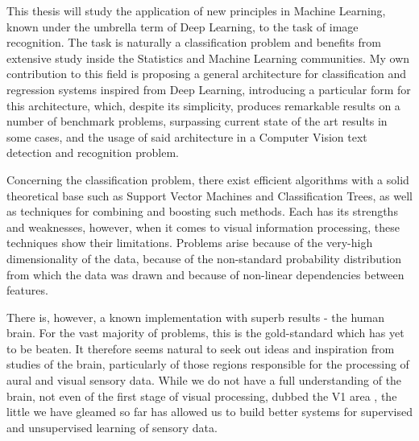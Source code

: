 \documentclass[12pt,a4paper,oneside,english]{UPBThesis}
\begin{document}

This thesis will study the application of new principles in Machine Learning, known under the umbrella term of Deep Learning, to the task of image recognition. The task is naturally a classification problem and benefits from extensive study inside the Statistics and Machine Learning communities. My own contribution to this field is proposing a general architecture for classification and regression systems inspired from Deep Learning, introducing a particular form for this architecture, which, despite its simplicity, produces remarkable results on a number of benchmark problems, surpassing current state of the art results in some cases, and the usage of said architecture in a Computer Vision text detection and recognition problem.

Concerning the classification problem, there exist efficient algorithms with a solid theoretical base such as Support Vector Machines and Classification Trees, as well as techniques for combining and boosting such methods. Each has its strengths and weaknesses, however,  when it comes to visual information processing, these techniques show their limitations. Problems arise because of the very-high dimensionality of the data, because of the non-standard probability distribution from which the data was drawn and because of non-linear dependencies between features.

There is, however, a known implementation with superb results - the human brain. For the vast majority of problems, this is the gold-standard which has yet to be beaten. It therefore seems natural to seek out ideas and inspiration from studies of the brain, particularly of those regions responsible for the processing of aural and visual sensory data. While we do not have a full understanding of the brain, not even of the first stage of visual processing, dubbed the V1 area \cite{understanding-V1,what-85percent-V1-doing}, the little we have gleamed so far has allowed us to build better systems for supervised \cite{gradient-based-learning,convolutional-networks-vision,best-practices-cnn,text-detection-character-recognition-unsupervised-feature-learning,multi-column-neural-networks,cnn-commitees-handwritten-character} and unsupervised learning \cite{high-level-features-unsupervised-feature-learning,tiny-images,reducing-dimensionality-neural-networks} of sensory data.
\end{document}
